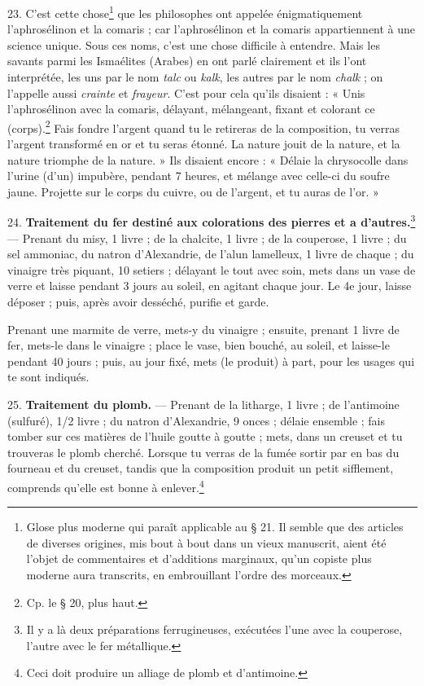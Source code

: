 \documentclass[a4paper, 11pt, oneside, polutonikogreek, french]{article}
\begin{document}
23. C'est cette chose\footnote{Glose plus moderne qui paraît applicable au § 21. Il semble que des articles de diverses origines, mis bout à bout dans un vieux manuscrit, aient été l'objet de commentaires et d'additions marginaux, qu'un copiste plus moderne aura transcrits, en embrouillant l'ordre des morceaux.} que les philosophes ont appelée énigmatiquement l'aphrosélinon et la comaris ; car l'aphrosélinon et la comaris appartiennent à une science unique. Sous ces noms, c'est une chose difficile à entendre. Mais les savants parmi les Ismaélites (Arabes) en ont parlé clairement et ils l'ont interprétée, les uns par le nom \emph{talc} ou \emph{kalk}, les autres par le nom \emph{chalk} ; on l'appelle aussi \emph{crainte} et \emph{frayeur}. C'est pour cela qu'ils disaient : « Unis l'aphrosélinon avec la comaris, délayant, mélangeant, fixant et colorant ce (corps).\footnote{Cp. le § 20, plus haut.} Fais fondre l'argent quand tu le retireras de la composition, tu verras l'argent transformé en or et tu seras étonné. La nature jouit de la nature, et la nature triomphe de la nature. » Ils disaient encore : « Délaie la chrysocolle dans l'urine (d'un) impubère, pendant 7 heures, et mélange avec celle-ci du soufre jaune. Projette sur le corps du cuivre, ou de l'argent, et tu auras de l'or. »

24. \textbf{Traitement du fer destiné aux colorations des pierres et a d'autres.}\footnote{Il y a là deux préparations ferrugineuses, exécutées l'une avec la couperose, l'autre avec le fer métallique.} --- Prenant du misy, 1 livre ; de la chalcite, 1 livre ; de la couperose, 1 livre ; du sel ammoniac, du natron d'Alexandrie, de l'alun lamelleux, 1 livre de chaque ; du vinaigre très piquant, 10 setiers ; délayant le tout avec soin, mets dans un vase de verre et laisse pendant 3 jours au soleil, en agitant chaque jour. Le 4e jour, laisse déposer ; puis, après avoir desséché, purifie et garde.

Prenant une marmite de verre, mets-y du vinaigre ; ensuite, prenant 1 livre de fer, mets-le dans le vinaigre ; place le vase, bien bouché, au soleil, et laisse-le pendant 40 jours ; puis, au jour fixé, mets (le produit) à part, pour les usages qui te sont indiqués.

25. \textbf{Traitement du plomb.} --- Prenant de la litharge, 1 livre ; de l'antimoine (sulfuré), 1/2 livre ; du natron d'Alexandrie, 9 onces ; délaie ensemble ; fais tomber sur ces matières de l'huile goutte à goutte ; mets, dans un creuset et tu trouveras le plomb cherché. Lorsque tu verras de la fumée sortir par en bas du fourneau et du creuset, tandis que la composition produit un petit sifflement, comprends qu'elle est bonne à enlever.\footnote{Ceci doit produire un alliage de plomb et d'antimoine.}
\end{document}
